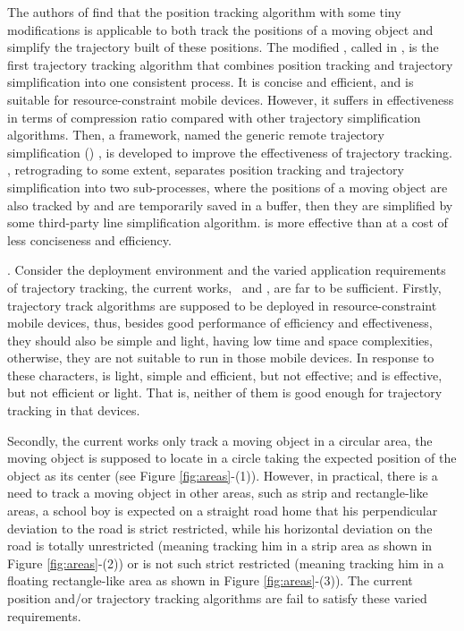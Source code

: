 The authors of \cite{Trajcevski:LDRH} find that the position tracking algorithm \ldr with some tiny modifications is applicable to both track the positions of a moving object and simplify the trajectory built of these positions. The modified \ldr,  called \ldrh in \cite{Lange:Tracking}, is the first trajectory tracking algorithm that combines position tracking and trajectory simplification into one consistent process. It is concise and efficient, and is suitable for resource-constraint mobile devices. However, it suffers in effectiveness in terms of compression ratio compared with other trajectory simplification algorithms. %
%
Then, a framework, named the generic remote trajectory simplification (\grts) \cite{Lange:GRTS,Lange:Tracking}, is developed to improve the effectiveness of trajectory tracking. \grts, retrograding to some extent, separates position tracking and trajectory simplification into two sub-processes, where the positions of a moving object are also tracked by \ldr and are temporarily saved in a buffer, then they are simplified by some third-party line simplification algorithm. \grts is more effective than \ldrh at a cost of less conciseness and efficiency.
%



. Consider the deployment environment and the varied application requirements of trajectory tracking, the current works, \ie~\ldrh and \grts, are far to be sufficient. Firstly, trajectory track algorithms are supposed to be deployed in resource-constraint mobile devices, thus, besides good performance of efficiency and effectiveness, they should also be simple and light, \ie having low time and space complexities, otherwise, they are not suitable to run in those mobile devices. In response to these characters, \ldrh is light, simple and efficient, but not effective; and \grts is effective, but not efficient or light. That is, neither of them is good enough for trajectory tracking in that devices.

Secondly, the current works only track a moving object in a circular area, \ie the moving object is supposed to locate in a circle taking the expected position of the object as its center (see Figure \ref{fig:areas}-(1)). However, in practical, there is a need to track a moving object in other areas, such as strip and rectangle-like areas, \eg a school boy is expected on a straight road home that his perpendicular deviation to the road is strict restricted, while his horizontal deviation on the road is totally unrestricted (meaning tracking him in a strip area as shown in Figure \ref{fig:areas}-(2)) or is not such strict restricted (meaning tracking him in a floating rectangle-like area as shown in Figure \ref{fig:areas}-(3)). The current position and/or trajectory tracking algorithms are fail to satisfy these varied requirements.



